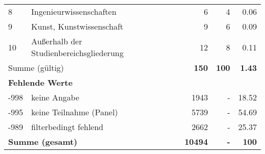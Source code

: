 \begin{longtable}{lXrrr}
     8 &
     \multicolumn{1}{X}{ Ingenieurwissenschaften   } &


       \num{6} &
       \num[round-mode=places,round-precision=2]{4} &
         \num[round-mode=places,round-precision=2]{0,06} \\

     9 &
     \multicolumn{1}{X}{ Kunst, Kunstwissenschaft   } &


       \num{9} &
       \num[round-mode=places,round-precision=2]{6} &
         \num[round-mode=places,round-precision=2]{0,09} \\

     10 &
     \multicolumn{1}{X}{ Außerhalb der Studienbereichsgliederung   } &


       \num{12} &
       \num[round-mode=places,round-precision=2]{8} &
         \num[round-mode=places,round-precision=2]{0,11} \\
     \midrule
     \multicolumn{2}{l}{Summe (gültig)} &
       \textbf{\num{150}} &
     \textbf{100} &
       \textbf{\num[round-mode=places,round-precision=2]{1,43}} \\
     \multicolumn{5}{l}{\textbf{Fehlende Werte}}\\
       -998 &
       keine Angabe &
         \num{1943} &
        - &
         \num[round-mode=places,round-precision=2]{18,52} \\
       -995 &
       keine Teilnahme (Panel) &
         \num{5739} &
        - &
         \num[round-mode=places,round-precision=2]{54,69} \\
       -989 &
       filterbedingt fehlend &
         \num{2662} &
        - &
         \num[round-mode=places,round-precision=2]{25,37} \\
     \midrule
     \multicolumn{2}{l}{\textbf{Summe (gesamt)}} &
          \textbf{\num{10494}} &
        \textbf{-} &
        \textbf{100} \\
     \bottomrule
     \end{longtable}
     
